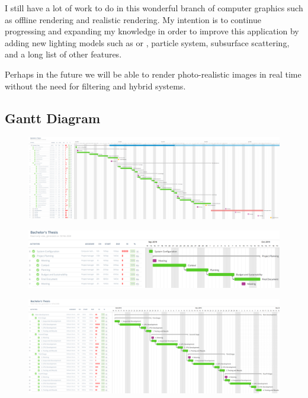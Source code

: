 \documentclass[titlepage,12pt]{report}
\begin{document}
I still have a lot of work to do in this wonderful branch of computer graphics such as offline rendering and realistic rendering. My intention is to continue progressing and expanding my knowledge in order to improve this application by adding new lighting models such as \citep[pp.~25--32]{Ashikhmin2000} or \citep[pp.~239--246]{Oren1994}, particle system, subsurface scattering, and a long list of other features. 

Perhaps in the future we will be able to render photo-realistic images in real time without the need for filtering and hybrid systems.


\newpage

\printbibliography

\begin{appendices}
\chapter{Gantt Diagram}

\uselandscape

\begin{figure}[H]
	\centering
	\includegraphics[scale=0.30]{media/final_gantt_esp.png}
	\label{gantt_esp}
\end{figure}

\begin{figure}[H]
	\centering
  	\includegraphics[scale=0.25]{media/gantt_gep.png}
  	\label{gantt_1}
\end{figure}

\begin{figure}[H]
	\centering
  	\includegraphics[scale=0.25]{media/gantt_dev_esp.png}
  	\label{gantt_2}
\end{figure}


\end{appendices}
\end{document}
